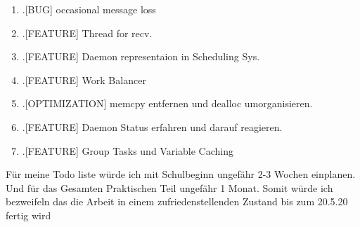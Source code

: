 \documentclass{article}
\begin{document}
\begin{enumerate}
	\item .[BUG] occasional message loss
	\item .[FEATURE] Thread for recv.
	\item .[FEATURE] Daemon representaion in Scheduling Sys.
	\item .[FEATURE] Work Balancer
	\item .[OPTIMIZATION] memcpy entfernen und dealloc umorganisieren.
	\item .[FEATURE] Daemon Status erfahren und darauf reagieren.
	\item .[FEATURE] Group Tasks und Variable Caching	
\end{enumerate}


Für meine Todo liste würde ich mit Schulbeginn ungefähr 2-3 Wochen einplanen. Und für das Gesamten Praktischen Teil ungefähr 1 Monat. Somit würde ich bezweifeln das die Arbeit in einem zufriedenstellenden Zustand bis zum 20.5.20 fertig wird
\end{document}
